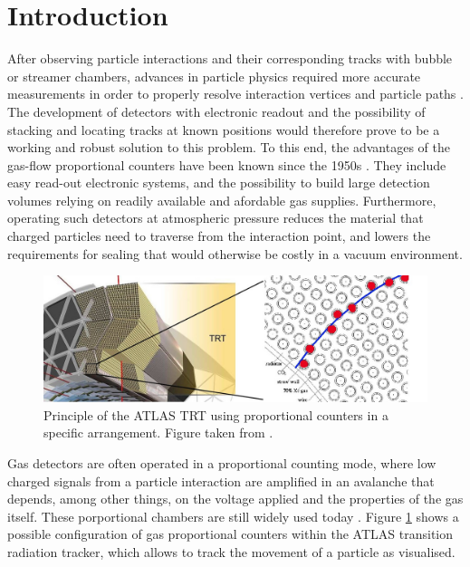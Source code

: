 \section{Introduction}  \label{sec:Introduction}
After observing particle interactions and their corresponding tracks with
bubble or streamer chambers, advances in particle physics required more accurate measurements in order to properly resolve interaction vertices and particle paths \cite{charpak_high-resolution_1984}. The development of detectors with electronic readout and the possibility of stacking and locating tracks at known positions would therefore
prove to be a working and robust solution to this problem. To this end, the advantages of
the gas-flow proportional counters have been known since the 1950s \cite{hendee_gasflow_1956}. They include easy read-out electronic systems, and the possibility to build large detection volumes relying on readily available and afordable gas supplies. Furthermore, operating such detectors at atmospheric pressure reduces the material that charged particles need to traverse from the interaction point, and lowers the requirements for sealing that would otherwise be costly in a vacuum environment.

\begin{figure}[htb]
  \includegraphics[width=\linewidth]{graphics/ATLAS_TRT_Principle_image}
  \caption{Principle of the ATLAS TRT using proportional counters in a specific
    arrangement. Figure taken from \cite{colliderscope}.}
  \label{fig:colliderscope}
\end{figure}

Gas detectors are often operated in a proportional counting mode, where low charged signals from a particle interaction are amplified in an avalanche that depends, among other things, on the voltage applied and the properties of the gas itself. These porportional chambers are still widely used today \cite{Mindur:2017nqn}. Figure \ref{fig:colliderscope} shows a possible configuration of gas proportional counters within the ATLAS transition radiation tracker, which allows to track the movement of a particle as visualised.

